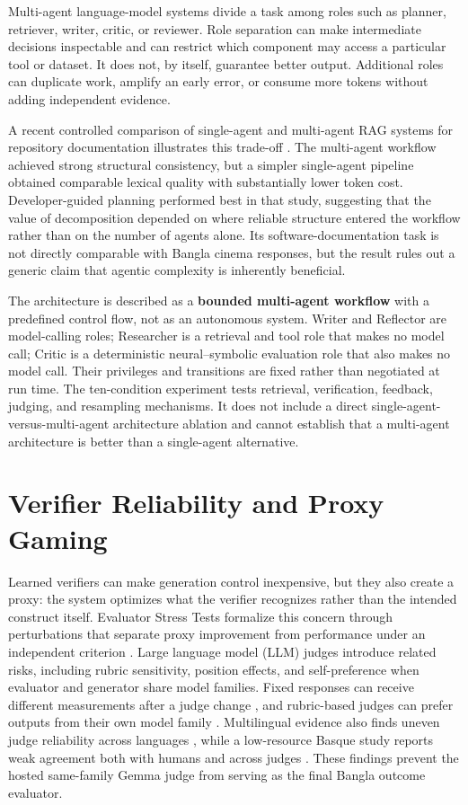 Multi-agent language-model systems divide a task among roles such as planner, retriever, writer, critic, or reviewer. Role separation can make intermediate decisions inspectable and can restrict which component may access a particular tool or dataset. It does not, by itself, guarantee better output. Additional roles can duplicate work, amplify an early error, or consume more tokens without adding independent evidence.

A recent controlled comparison of single-agent and multi-agent RAG systems for repository documentation illustrates this trade-off \cite{b21}. The multi-agent workflow achieved strong structural consistency, but a simpler single-agent pipeline obtained comparable lexical quality with substantially lower token cost. Developer-guided planning performed best in that study, suggesting that the value of decomposition depended on where reliable structure entered the workflow rather than on the number of agents alone. Its software-documentation task is not directly comparable with Bangla cinema responses, but the result rules out a generic claim that agentic complexity is inherently beneficial.

The architecture is described as a \textbf{bounded multi-agent workflow} with a predefined control flow, not as an autonomous system. Writer and Reflector are model-calling roles; Researcher is a retrieval and tool role that makes no model call; Critic is a deterministic neural–symbolic evaluation role that also makes no model call. Their privileges and transitions are fixed rather than negotiated at run time. The ten-condition experiment tests retrieval, verification, feedback, judging, and resampling mechanisms. It does not include a direct single-agent-versus-multi-agent architecture ablation and cannot establish that a multi-agent architecture is better than a single-agent alternative.

\section{Verifier Reliability and Proxy Gaming}
\label{sec:verifier-reliability}

Learned verifiers can make generation control inexpensive, but they also create a proxy: the system optimizes what the verifier recognizes rather than the intended construct itself. Evaluator Stress Tests formalize this concern through perturbations that separate proxy improvement from performance under an independent criterion \cite{b7}. Large language model (LLM) judges introduce related risks, including rubric sensitivity, position effects, and self-preference when evaluator and generator share model families. Fixed responses can receive different measurements after a judge change \cite{b22}, and rubric-based judges can prefer outputs from their own model family \cite{b23}. Multilingual evidence also finds uneven judge reliability across languages \cite{b24}, while a low-resource Basque study reports weak agreement both with humans and across judges \cite{b25}. These findings prevent the hosted same-family Gemma judge from serving as the final Bangla outcome evaluator.

